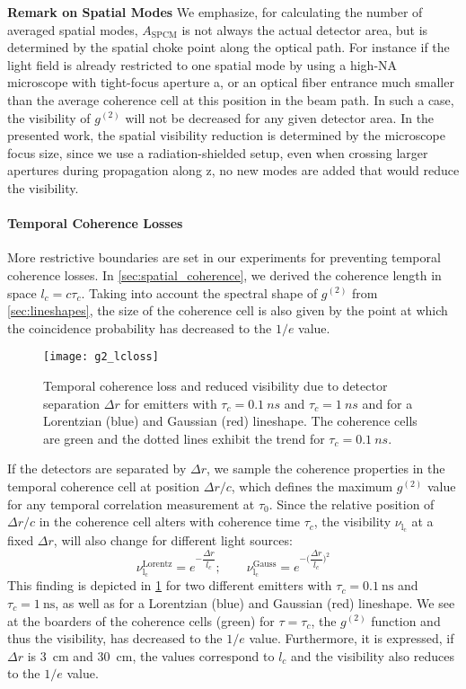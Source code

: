 \textbf{Remark on Spatial Modes} We emphasize, for calculating the number of averaged spatial modes, $A_\mathrm{SPCM}$ is not always the actual detector area, but is determined by the spatial choke point along the optical path. For instance if the light field is already restricted to one spatial mode by using a high-NA microscope with tight-focus aperture a, or an optical fiber entrance much smaller than the average coherence cell at this position in the beam path. In such a case, the visibility of $g^{(2)}$ will not be decreased for any given detector area. In the presented work, the spatial visibility reduction is determined by the microscope focus size, since we use a radiation-shielded setup, even when crossing larger apertures during propagation along z, no new modes are added that would reduce the visibility.

\paragraph{Temporal Coherence Losses}\label{sec:temp_coh_loss} More restrictive boundaries are set in our experiments for preventing temporal coherence losses. In \cref{sec:spatial_coherence}, we derived the coherence length in space $l_c=c\tau_c$. Taking into account the spectral shape of $g^{(2)}$ from \cref{sec:lineshapes}, the size of the coherence cell is also given by the point at which the coincidence probability has decreased to the $1/e$ value. 
\begin{figure}[h!]
	\centering
	\texttt{[image: g2\_lcloss]}
	\caption{Temporal coherence loss and reduced visibility due to detector separation $\Delta r$ for emitters with $\tau_c=\SI{0.1}{ns}$ and $\tau_c=\SI{1}{ns}$ and for a Lorentzian (blue) and Gaussian (red) lineshape. The coherence cells are green and the dotted lines exhibit the trend for $\tau_c=\SI{0.1}{ns}$.}
	\label{fig:g2_lcloss}
\end{figure}
\noindent If the detectors are separated by $\Delta r$, we sample the coherence properties in the temporal coherence cell at position $\Delta r/c$, which defines the maximum $g^{(2)}$ value for any temporal correlation measurement at $\tau_0$. Since the relative position of $\Delta r/c$ in the coherence cell alters with coherence time $\tau_c$, the visibility $\nu_\mathrm{l_c}$ at a fixed $\Delta r$, will also change for different light sources:
\begin{equation}\label{eq:g2coherencelosstemp}
	\nu_\mathrm{l_c}^\mathrm{Lorentz}=e^{-\dfrac{\Delta r}{l_c}};\qquad\nu_\mathrm{l_c}^\mathrm{Gauss}=e^{-\Big(\dfrac{\Delta r}{l_c}\Big)^2}
\end{equation}
This finding is depicted in \cref{fig:g2_lcloss} for two different emitters with $\tau_c=\SI{0.1}{\ns}$ and $\tau_c=\SI{1}{\ns}$, as well as for a Lorentzian (blue) and Gaussian (red) lineshape. We see at the boarders of the coherence cells (green) for $\tau=\tau_c$, the $g^{(2)}$ function and thus the visibility, has decreased to the $1/e$ value. Furthermore, it is expressed, if $\Delta r$ is \SI{3}{cm} and \SI{30}{cm}, the values correspond to $l_c$ and the visibility also reduces to the $1/e$ value.

